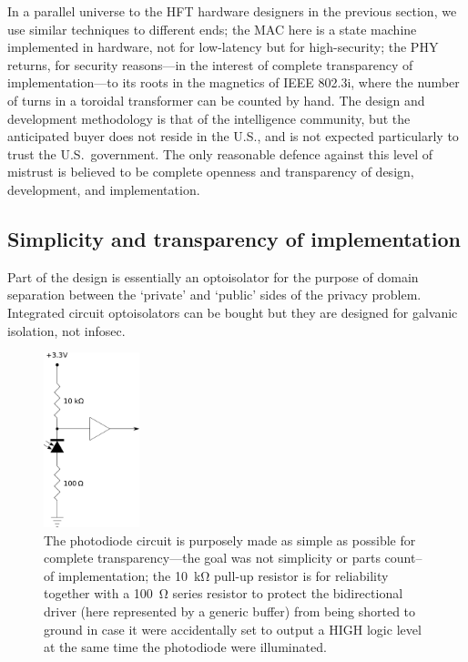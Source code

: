 \documentclass[conference]{IEEEtran}
\begin{document}
In a parallel universe to the HFT hardware designers in the previous section,
we use similar techniques to different ends; the MAC here is a state machine
implemented in hardware, not for low-latency but for high-security; the PHY
returns, for security reasons---in the interest of complete transparency of
implementation---to its roots in the magnetics of IEEE 802.3i, where the
number of turns in a toroidal transformer can be counted by hand. The design
and development methodology is that of the intelligence community, but the
anticipated buyer does not reside in the U.S., and is not expected
particularly to trust the U.S.\ government. The only reasonable defence
against this level of mistrust is believed to be complete openness and
transparency of design, development, and implementation.

\subsection{Simplicity and transparency of implementation}

Part of the design is essentially an optoisolator for the purpose of domain
separation between the `private' and `public' sides of the privacy problem.
Integrated circuit optoisolators can be bought but they are designed for
galvanic isolation, not infosec.

\begin{figure}[!t]
    \centering
	\includegraphics[height=2in]{photodiode_pullup_and_GPIO_protection.png}
	\caption{The photodiode circuit is purposely made as simple as possible
        for complete transparency---the goal was not simplicity or parts
        count--of implementation; the \SI{10}{\kilo\ohm} pull-up resistor is
        for reliability together with a \SI{100}{\ohm} series resistor to
        protect the bidirectional driver (here represented by a generic
        buffer) from being shorted to ground in case it were accidentally set
        to output a HIGH logic level at the same time the photodiode were
        illuminated.}
	\label{figure:photodiode_pullup}
\end{figure}
\end{document}
